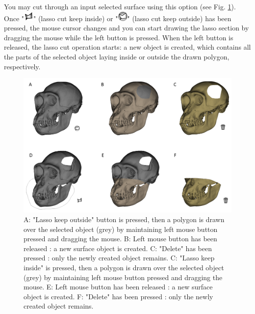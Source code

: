 You may cut through an input selected surface using this option (see Fig. \ref{lasso_cut}). Once "\includegraphics[scale=0.7]{images/06/objects/lasso_keepinside.png}" (lasso cut keep inside) or "\includegraphics[scale=0.7]{images/06/objects/lasso_keepoutside.png}" (lasso cut keep outside) has been pressed, the mouse cursor changes and you can start drawing the lasso section by dragging the mouse while the left button is pressed. When the left button is released, the lasso cut operation starts: a new object is created, which contains all the parts of the selected object laying inside or outside the drawn polygon, respectively.\\

\begin{figure}
  \centering
  \includegraphics[scale=0.6]{images/06/objects/lasso_cut.png} 
	\caption{A: "Lasso keep outside" button is pressed, then a polygon is drawn over the selected object (grey) by maintaining left mouse button pressed and dragging the mouse. B: Left mouse button has been released : a new surface object is  created. C: "Delete" has been pressed : only the newly created  object remains. C: "Lasso keep inside" is pressed, then a polygon is drawn over the selected object (grey) by maintaining left mouse button pressed and dragging the mouse. E: Left mouse button has been released : a new surface object is  created. F: "Delete" has been pressed : only the newly created  object remains. }
\label{lasso_cut}
 
\end{figure}




